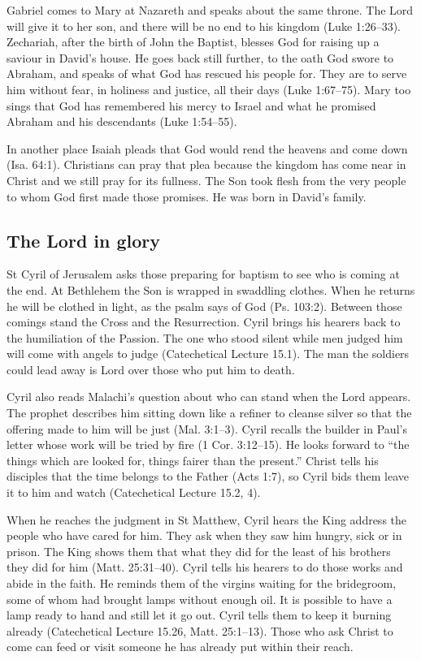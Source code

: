 Gabriel comes to Mary at Nazareth and speaks about the same throne. The Lord
will give it to her son, and there will be no end to his kingdom (Luke
1:26--33). Zechariah, after the birth of John the Baptist, blesses God for
raising up a saviour in David's house. He goes back still further, to the oath
God swore to Abraham, and speaks of what God has rescued his people for.
They are to serve him without fear, in holiness and justice, all their days
(Luke 1:67--75). Mary too sings that God has remembered his mercy to Israel
and what he promised Abraham and his descendants (Luke 1:54--55).

In another place Isaiah pleads that God would rend the heavens and come down
(Isa. 64:1). Christians can pray that plea because the kingdom has come near
in Christ and we still pray for its fullness. The Son took flesh from the
very people to whom God first made those promises. He was born in David's
family.

\subsection{The Lord in glory}

St Cyril of Jerusalem asks those preparing for baptism to see who is coming
at the end. At Bethlehem the Son is wrapped in swaddling clothes. When he
returns he will be clothed in light, as the psalm says of God (Ps. 103:2).
Between those comings stand the Cross and the Resurrection. Cyril brings his
hearers back to the humiliation of the Passion. The one who stood silent
while men judged him will come with angels to judge (Catechetical Lecture
15.1). The man the soldiers could lead away is Lord over those who put him
to death.

Cyril also reads Malachi's question about who can stand when the Lord
appears. The prophet describes him sitting down like a refiner to cleanse
silver so that the offering made to him will be just (Mal. 3:1--3).
Cyril recalls the builder in Paul's letter whose work will be tried by
fire (1 Cor. 3:12--15). He looks forward to “the things which are looked for,
things fairer than the present.” Christ tells his disciples that the time
belongs to the Father (Acts 1:7), so Cyril bids them leave it to him and
watch (Catechetical Lecture 15.2, 4).

When he reaches the judgment in St Matthew, Cyril hears the King address the
people who have cared for him. They ask when they saw him hungry, sick or in
prison. The King shows them that what they did for the least of his brothers
they did for him (Matt. 25:31--40). Cyril tells his hearers to do those works
and abide in the faith. He reminds them of the virgins waiting for the
bridegroom, some of whom had brought lamps without enough oil. It is
possible to have a lamp ready to hand and still let it go out. Cyril tells
them to keep it burning already (Catechetical Lecture 15.26, Matt.
25:1--13). Those who ask Christ to come can feed or visit someone he has
already put within their reach.

